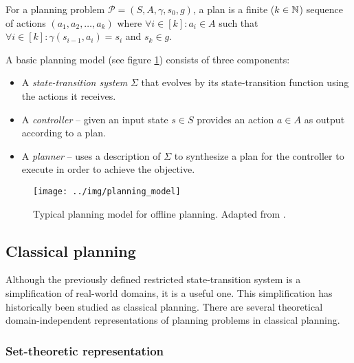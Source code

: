 \begin{defn}[Plan]\label{defn:plan}\cite[Section~1.5]{Ghallab2004}
For a planning problem $\mathcal{P} = (S, A, \gamma, s_0, g)$,
a plan is a finite ($k \in \mathbb{N}$) sequence of actions $(a_1, a_2, \ldots, a_k)$ where
$\forall i \in [k] : a_i \in A$ such that
$\forall i \in [k] : \gamma(s_{i-1}, a_i) = s_i$ and $s_k \in g$.
\end{defn}

\noindent A basic planning model (see figure \ref{fig:planning-model}) consists of three components:

\begin{itemize}
\item A \textit{state-transition system} $\Sigma$ that evolves by its state-transition function using the actions
it receives.
\item A \textit{controller} -- given an input state $s \in S$ provides an action $a \in A$ as output according
to a plan.
\item A \textit{planner} -- uses a description of $\Sigma$ to synthesize a plan for the controller
to execute in order to achieve the objective.
\end{itemize}

\begin{figure}[htb]
\begin{center}
\texttt{[image: ../img/planning\_model]}
\end{center}
\caption{Typical planning model for offline planning. Adapted from \cite[Figure~1.3]{Ghallab2004}.}
\label{fig:planning-model}
\end{figure}

\subsection{Classical planning}\label{classical-planning}

Although the previously defined restricted state-transition system is a simplification of real-world
domains, it is a useful one. 
This simplification has historically been studied as classical planning.
There are several theoretical domain-independent representations
of planning problems in classical planning. \cite[Chapter~2]{Ghallab2004}

\subsubsection{Set-theoretic representation}

